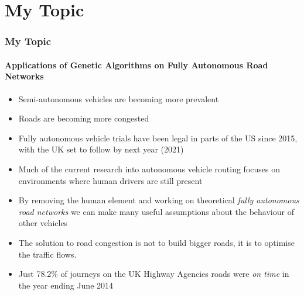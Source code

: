 \documentclass{beamer}
\author{Sam Barrett, 1803086}
\title{{Master's Project Presentation} \\ \texorpdfstring
        {\texttt{[image: uobcrest.jpg]}}
    }
\institute{{University of Birmingham}}
\date{\today}
\begin{document}
\begin{frame}
\titlepage
\end{frame}


\section{My Topic}
\begin{frame}
    \frametitle{My Topic}
    \framesubtitle{Applications of Genetic Algorithms on Fully Autonomous Road Networks}

    \begin{itemize}

        \item Semi-autonomous vehicles are becoming more prevalent 
        \item Roads are becoming more congested
        \item Fully autonomous vehicle trials have been legal in parts of the US since 2015\cite{AutonomousVehiclesSelfDriving}, with the UK set to follow by next year (2021)\cite{UKWantsFully2019}
        \item Much of the current research into autonomous vehicle routing focuses on environments where human drivers are still present
        \item By removing the human element and working on theoretical \textit{fully autonomous road networks} we can make many useful assumptions about the behaviour of other vehicles
        \item The solution to road congestion is not to build bigger roads, it is to optimise the traffic flows.
        \item Just 78.2\% of journeys on the UK Highway Agencies roads were \textit{on time} in the year ending June 2014 \cite{measures02079443095ReliabilityJourneysHighways}

    \end{itemize}
\end{frame}
\end{document}

